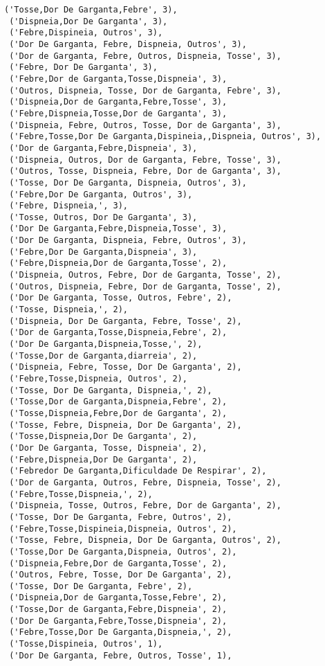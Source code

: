 \documentclass[11pt]{article}
\begin{document}
\begin{tcolorbox}[breakable, size=fbox, boxrule=.5pt, pad at break*=1mm, opacityfill=0]
\begin{Verbatim}[commandchars=\\\{\}]
 ('Tosse,Dor De Garganta,Febre', 3),
 ('Dispneia,Dor De Garganta', 3),
 ('Febre,Dispineia, Outros', 3),
 ('Dor De Garganta, Febre, Dispneia, Outros', 3),
 ('Dor de Garganta, Febre, Outros, Dispneia, Tosse', 3),
 ('Febre, Dor De Garganta', 3),
 ('Febre,Dor de Garganta,Tosse,Dispneia', 3),
 ('Outros, Dispneia, Tosse, Dor de Garganta, Febre', 3),
 ('Dispneia,Dor de Garganta,Febre,Tosse', 3),
 ('Febre,Dispneia,Tosse,Dor de Garganta', 3),
 ('Dispneia, Febre, Outros, Tosse, Dor de Garganta', 3),
 ('Febre,Tosse,Dor De Garganta,Dispineia,,Dispneia, Outros', 3),
 ('Dor de Garganta,Febre,Dispneia', 3),
 ('Dispneia, Outros, Dor de Garganta, Febre, Tosse', 3),
 ('Outros, Tosse, Dispneia, Febre, Dor de Garganta', 3),
 ('Tosse, Dor De Garganta, Dispneia, Outros', 3),
 ('Febre,Dor De Garganta, Outros', 3),
 ('Febre, Dispneia,', 3),
 ('Tosse, Outros, Dor De Garganta', 3),
 ('Dor De Garganta,Febre,Dispneia,Tosse', 3),
 ('Dor De Garganta, Dispneia, Febre, Outros', 3),
 ('Febre,Dor De Garganta,Dispneia', 3),
 ('Febre,Dispneia,Dor de Garganta,Tosse', 2),
 ('Dispneia, Outros, Febre, Dor de Garganta, Tosse', 2),
 ('Outros, Dispneia, Febre, Dor de Garganta, Tosse', 2),
 ('Dor De Garganta, Tosse, Outros, Febre', 2),
 ('Tosse, Dispneia,', 2),
 ('Dispneia, Dor De Garganta, Febre, Tosse', 2),
 ('Dor de Garganta,Tosse,Dispneia,Febre', 2),
 ('Dor De Garganta,Dispneia,Tosse,', 2),
 ('Tosse,Dor de Garganta,diarreia', 2),
 ('Dispneia, Febre, Tosse, Dor De Garganta', 2),
 ('Febre,Tosse,Dispneia, Outros', 2),
 ('Tosse, Dor De Garganta, Dispneia,', 2),
 ('Tosse,Dor de Garganta,Dispneia,Febre', 2),
 ('Tosse,Dispneia,Febre,Dor de Garganta', 2),
 ('Tosse, Febre, Dispneia, Dor De Garganta', 2),
 ('Tosse,Dispneia,Dor De Garganta', 2),
 ('Dor De Garganta, Tosse, Dispneia', 2),
 ('Febre,Dispneia,Dor De Garganta', 2),
 ('Febredor De Garganta,Dificuldade De Respirar', 2),
 ('Dor de Garganta, Outros, Febre, Dispneia, Tosse', 2),
 ('Febre,Tosse,Dispneia,', 2),
 ('Dispneia, Tosse, Outros, Febre, Dor de Garganta', 2),
 ('Tosse, Dor De Garganta, Febre, Outros', 2),
 ('Febre,Tosse,Dispineia,Dispneia, Outros', 2),
 ('Tosse, Febre, Dispneia, Dor De Garganta, Outros', 2),
 ('Tosse,Dor De Garganta,Dispneia, Outros', 2),
 ('Dispneia,Febre,Dor de Garganta,Tosse', 2),
 ('Outros, Febre, Tosse, Dor De Garganta', 2),
 ('Tosse, Dor De Garganta, Febre', 2),
 ('Dispneia,Dor de Garganta,Tosse,Febre', 2),
 ('Tosse,Dor de Garganta,Febre,Dispneia', 2),
 ('Dor De Garganta,Febre,Tosse,Dispneia', 2),
 ('Febre,Tosse,Dor De Garganta,Dispneia,', 2),
 ('Tosse,Dispineia, Outros', 1),
 ('Dor De Garganta, Febre, Outros, Tosse', 1),

\end{Verbatim}
\end{tcolorbox}
\end{document}
